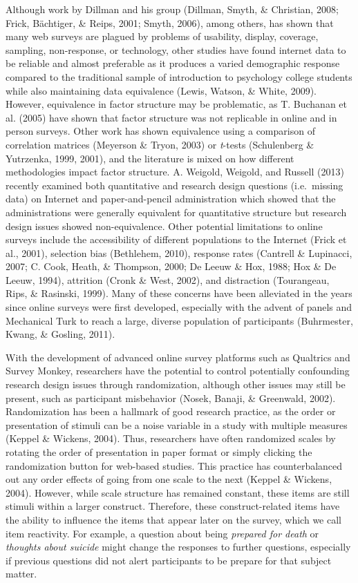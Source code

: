 \documentclass[english,man, mask]{apa6}
\theoremstyle{definition}
\theoremstyle{definition}
\theoremstyle{definition}
\theoremstyle{remark}
\begin{document}
Although work by Dillman and his group (Dillman, Smyth, \& Christian,
2008; Frick, Bächtiger, \& Reips, 2001; Smyth, 2006), among others, has
shown that many web surveys are plagued by problems of usability,
display, coverage, sampling, non-response, or technology, other studies
have found internet data to be reliable and almost preferable as it
produces a varied demographic response compared to the traditional
sample of introduction to psychology college students while also
maintaining data equivalence (Lewis, Watson, \& White, 2009). However,
equivalence in factor structure may be problematic, as T. Buchanan et
al. (2005) have shown that factor structure was not replicable in online
and in person surveys. Other work has shown equivalence using a
comparison of correlation matrices (Meyerson \& Tryon, 2003) or
\emph{t}-tests (Schulenberg \& Yutrzenka, 1999, 2001), and the
literature is mixed on how different methodologies impact factor
structure. A. Weigold, Weigold, and Russell (2013) recently examined
both quantitative and research design questions (i.e.~missing data) on
Internet and paper-and-pencil administration which showed that the
administrations were generally equivalent for quantitative structure but
research design issues showed non-equivalence. Other potential
limitations to online surveys include the accessibility of different
populations to the Internet (Frick et al., 2001), selection bias
(Bethlehem, 2010), response rates (Cantrell \& Lupinacci, 2007; C. Cook,
Heath, \& Thompson, 2000; De Leeuw \& Hox, 1988; Hox \& De Leeuw, 1994),
attrition (Cronk \& West, 2002), and distraction (Tourangeau, Rips, \&
Rasinski, 1999). Many of these concerns have been alleviated in the
years since online surveys were first developed, especially with the
advent of panels and Mechanical Turk to reach a large, diverse
population of participants (Buhrmester, Kwang, \& Gosling, 2011).

With the development of advanced online survey platforms such as
Qualtrics and Survey Monkey, researchers have the potential to control
potentially confounding research design issues through randomization,
although other issues may still be present, such as participant
misbehavior (Nosek, Banaji, \& Greenwald, 2002). Randomization has been
a hallmark of good research practice, as the order or presentation of
stimuli can be a noise variable in a study with multiple measures
(Keppel \& Wickens, 2004). Thus, researchers have often randomized
scales by rotating the order of presentation in paper format or simply
clicking the randomization button for web-based studies. This practice
has counterbalanced out any order effects of going from one scale to the
next (Keppel \& Wickens, 2004). However, while scale structure has
remained constant, these items are still stimuli within a larger
construct. Therefore, these construct-related items have the ability to
influence the items that appear later on the survey, which we call item
reactivity. For example, a question about being \emph{prepared for
death} or \emph{thoughts about suicide} might change the responses to
further questions, especially if previous questions did not alert
participants to be prepare for that subject matter.
\end{document}

